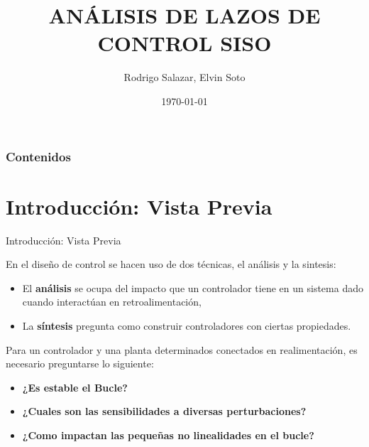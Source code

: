 \documentclass{beamer}
\title{ANÁLISIS DE LAZOS DE CONTROL SISO}
\author{Rodrigo Salazar, Elvin Soto}
\institute{UACH}
\date{\today}
\begin{document}
\begin{frame}
  \titlepage
\end{frame}


\begin{frame}
  \frametitle{Contenidos}
  \tableofcontents
\end{frame}


\section{Introducción: Vista Previa}
\begin{frame}{Introducción: Vista Previa}

\begin{justify}  
 En el diseño de control se hacen uso de dos técnicas, el análisis y la sintesis:

\vspace{0.3 cm}
\begin{itemize}
     

    \item El \textbf{análisis} se ocupa del impacto que un controlador tiene en un sistema dado cuando interactúan en retroalimentación, 

    \item La \textbf{síntesis} pregunta como construir controladores con ciertas propiedades.

\end{itemize}

 \vspace{0.3 cm}
 Para un controlador y una planta determinados conectados en realimentación, es necesario preguntarse lo siguiente:

\begin{itemize}
 
 \vspace{0.3 cm}
    \item\textbf{¿Es estable el Bucle?} 

 \vspace{0.1 cm}
    \item\textbf{¿Cuales son las sensibilidades a diversas perturbaciones?} 

 \vspace{0.1 cm}
    \item\textbf{¿Como impactan las pequeñas no linealidades en el bucle?} 

\end{itemize}
\end{justify}
\end{frame}
\end{document}
